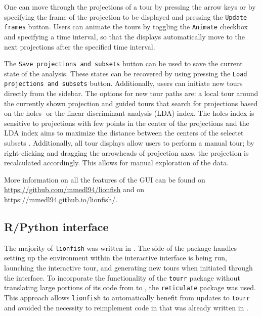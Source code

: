 \documentclass[article]{ajs}
\begin{document}
One can move through the projections of a tour by pressing the arrow keys or by specifying the frame of the projection to be displayed and pressing the \texttt{Update frames} button. Users can animate the tours by toggling the \texttt{Animate} checkbox and specifying a time interval, so that the displays automatically move to the next projections after the specified time interval.

The \texttt{Save projections and subsets} button can be used to save the current state of the analysis. These states can be recovered by using pressing the \texttt{Load projections and subsets} button. Additionally, users can initiate new tours directly from the sidebar. The options for new tour paths are: a local tour around the currently shown projection and guided tours that search for projections based on the holes- or the linear discriminant analysis (LDA) index. The holes index is sensitive to projections with few points in the center of the projections and the LDA index aims to maximize the distance between the centers of the selectet subsets \citep{ggobi}. Additionally, all tour displays allow users to perform a manual tour; by right-clicking and dragging the arrowheads of projection axes, the projection is recalculated accordingly. This allows for manual exploration of the data.

More information on all the features of the GUI can be found on \href{https://github.com/mmedl94/lionfish}{https://github.com/mmedl94/lionfish} and on \href{https://mmedl94.github.io/lionfish/}{https://mmedl94.github.io/lionfish/}.

\subsection{R/Python interface}

The majority of \texttt{lionfish} was written in  \citep{python}. The  \citep{R} side of the package handles setting up the  environment within the interactive interface is being run, launching the interactive tour, and generating new tours when initiated through the interface. To incorporate the functionality of the \texttt{tourr} package without translating large portions of its code from  to , the \texttt{reticulate} package was used. This approach allows \texttt{lionfish} to automatically benefit from updates to \texttt{tourr} and avoided the necessity to reimplement code in  that was already written in .
\end{document}
